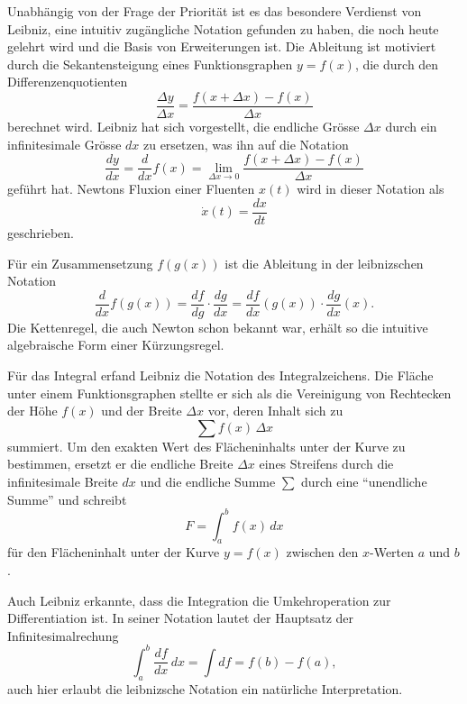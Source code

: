 Unabhängig von der Frage der Priorität ist es das besondere Verdienst
von Leibniz, eine intuitiv zugängliche Notation gefunden zu haben,
die noch heute gelehrt wird und die Basis von Erweiterungen ist.
Die Ableitung ist motiviert durch die Sekantensteigung eines
%
%
Funktionsgraphen $y=f(x)$, die durch den Differenzenquotienten
\[
\frac{\Delta y}{\Delta x}
=
\frac{f(x+\Delta x) - f(x)}{\Delta x}
\]
berechnet wird.
Leibniz hat sich vorgestellt, die endliche Grösse $\Delta x$ durch
ein infinitesimale Grösse $dx$ zu ersetzen, was ihn auf die Notation
\[
\frac{dy}{dx}
=
\frac{d}{dx}f(x)
=
\lim_{\Delta x\to 0}
\frac{f(x+\Delta x) - f(x)}{\Delta x}
\]
geführt hat.
Newtons Fluxion einer Fluenten $x(t)$ wird in dieser Notation
als
\[
\dot{x}(t) = \frac{dx}{dt}
\]
geschrieben.

Für ein Zusammensetzung $f(g(x))$ ist die Ableitung in der leibnizschen
Notation 
\[
\frac{d}{dx}f(g(x))
=
\frac{df}{dg}\cdot \frac{dg}{dx}
=
\frac{df}{dx}(g(x))\cdot \frac{dg}{dx}(x).
\]
Die Kettenregel, die auch Newton schon bekannt war, erhält so die
%
intuitive algebraische Form einer Kürzungsregel.
%

Für das Integral erfand Leibniz die Notation des Integralzeichens.
%
%
Die Fläche unter einem Funktionsgraphen stellte er sich als die
Vereinigung von Rechtecken der Höhe $f(x)$ und der Breite $\Delta x$
vor, deren Inhalt sich zu
\[
\sum f(x)\,\Delta x
\]
summiert.
Um den exakten Wert des Flächeninhalts unter der Kurve zu bestimmen,
ersetzt er die endliche Breite $\Delta x$ eines Streifens durch die
infinitesimale Breite $dx$ und die endliche Summe $\sum$ durch eine
``unendliche Summe'' und schreibt
\[
F
=
\int_a^b f(x)\,dx
\]
für den Flächeninhalt unter der Kurve $y=f(x)$ zwischen den $x$-Werten
$a$ und $b$.

Auch Leibniz erkannte, dass die Integration die Umkehroperation zur
Differentiation ist.
In seiner Notation lautet der Hauptsatz der Infinitesimalrechung
%
\[
\int_a^b \frac{df}{dx}\,dx
=
\int df
=
f(b) - f(a),
\]
auch hier erlaubt die leibnizsche Notation ein natürliche Interpretation.

